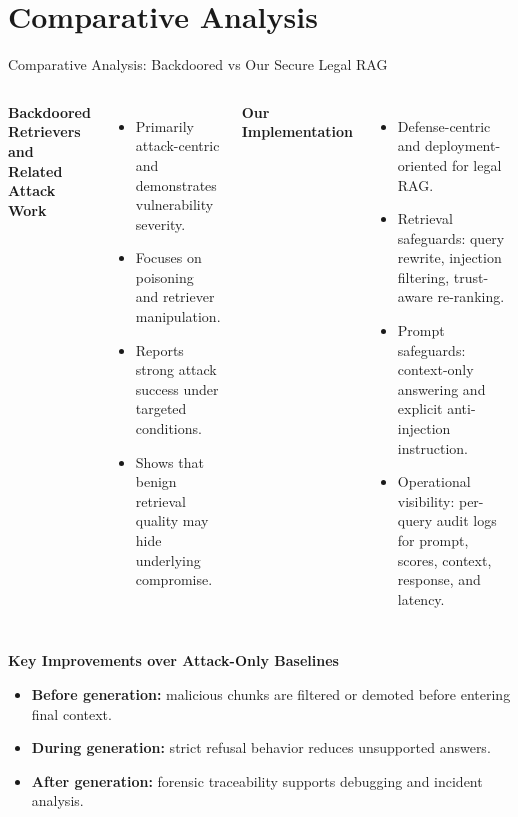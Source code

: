 \documentclass[aspectratio=169]{beamer}
\begin{document}
\section{Comparative Analysis}
\begin{frame}{Comparative Analysis: Backdoored vs Our Secure Legal RAG}
\scriptsize
\begin{columns}[T,totalwidth=\textwidth]
    \textbf{Backdoored Retrievers and Related Attack Work}
    \begin{itemize}
        \item Primarily attack-centric and demonstrates vulnerability severity.
        \item Focuses on poisoning and retriever manipulation.
        \item Reports strong attack success under targeted conditions.
        \item Shows that benign retrieval quality may hide underlying compromise.
    \end{itemize}

    \textbf{Our Implementation}
    \begin{itemize}
        \item Defense-centric and deployment-oriented for legal RAG.
        \item Retrieval safeguards: query rewrite, injection filtering, trust-aware re-ranking.
        \item Prompt safeguards: context-only answering and explicit anti-injection instruction.
        \item Operational visibility: per-query audit logs for prompt, scores, context, response, and latency.
    \end{itemize}
\end{columns}

\vspace{0.35em}
\textbf{Key Improvements over Attack-Only Baselines}
\begin{itemize}
    \item \textbf{Before generation:} malicious chunks are filtered or demoted before entering final context.
    \item \textbf{During generation:} strict refusal behavior reduces unsupported answers.
    \item \textbf{After generation:} forensic traceability supports debugging and incident analysis.
\end{itemize}
\end{frame}
\end{document}
